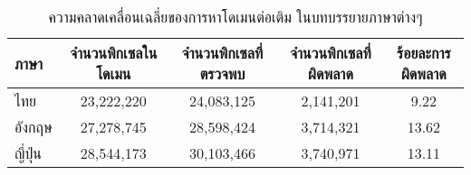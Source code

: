 \begin{table}[H]
    \centering
        \footnotesize
    \begin{tabular}[ht]{|l|c|c|c|c|}
        \hline
        ภาษา  & จำนวนพิกเซลในโดเมน & จำนวนพิกเซลที่ตรวจพบ & จำนวนพิกเซลที่ผิดพลาด & ร้อยละการผิดพลาด \\
        \hline
        ไทย & 23,222,220 & 24,083,125 & 2,141,201 & 9.22 \\
        อังกฤษ & 27,278,745 & 28,598,424 & 3,714,321 & 13.62 \\
        ญี่ปุ่น & 28,544,173 & 30,103,466 & 3,740,971 & 13.11 \\
        \hline
    \end{tabular}
    \caption{ความคลาดเคลื่อนเฉลี่ยของการหาโดเมนต่อเติม ในบทบรรยายภาษาต่างๆ}
\end{table}	
